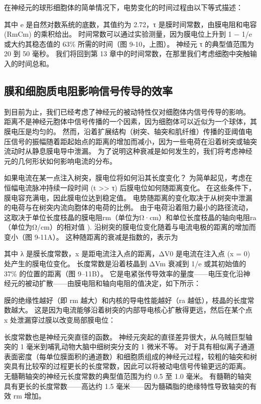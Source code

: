 在神经元的球形细胞体的简单情况下，电势变化的时间过程由以下等式描述：

其中 e 是自然对数系统的底数，其值约为 2.72，τ 是膜时间常数，由膜电阻和电容 (RmCm) 的乘积给出。 时间常数可以通过实验测量，因为膜电位上升到 1 − 1/e 或大约其稳态值的 63\% 所需的时间（图 9-10，上图）。 神经元 τ 的典型值范围为 20 到 50 毫秒。 我们将回到第 13 章中的时间常数，在那里我们考虑细胞中突触输入的时间总和。

\subsection{膜和细胞质电阻影响信号传导的效率}
到目前为止，我们已经考虑了神经元的被动特性仅对细胞体内信号传导的影响。 距离不是神经元胞体中信号传播的一个因素，因为细胞体可以近似为一个球体，其膜电压是均匀的。 然而，沿着扩展结构（树突、轴突和肌纤维）传播的亚阈值电压信号的振幅随着距起始点的距离的增加而减小，因为一些电荷在沿着树突或轴突流动时从静息膜电导中泄漏。 为了说明这种衰减是如何发生的，我们将考虑神经元的几何形状如何影响电流的分布。

如果电流在某一点注入树突，膜电位将如何沿其长度变化？ 为简单起见，考虑在恒幅电流脉冲持续一段时间 (t >> τ) 后膜电位如何随距离变化。 在这些条件下，膜电容充满电，因此膜电位达到稳定值。 电势随距离的变化取决于从树突中泄漏的电荷与在树突内流向胞体的电荷的比例。 由于电荷沿着阻力最小的路径流动，这取决于单位长度枝晶的膜电阻rm（单位为Ω·cm）和单位长度枝晶的轴向电阻ra（单位为Ω/cm）的相对值 ). 沿树突的膜电位变化随着与电流电极的距离的增加而变小（图 9-11A）。 这种随距离的衰减是指数的，表示为

其中 λ 是膜长度常数，x 是距电流注入点的距离，ΔV0 是电流在注入点 (x = 0) 处产生的膜电位变化。 长度常数是沿着枝晶到 ΔVm 衰减到 1/e 或其初始值的 37\% 的位置的距离（图 9–11B）。 它是电紧张传导效率的量度——电压变化沿神经元的被动扩散——由膜电阻和轴向电阻的值决定，如下所示：

膜的绝缘性越好（即 rm 越大）和内核的导电性能越好（ra 越低），枝晶的长度常数越大。 这是因为电流能够沿着树突的内部导电核心扩散得更远，然后在某个点 x 处泄漏穿过膜以改变局部膜电位：

长度常数也是神经元突直径的函数。 神经元突起的直径差异很大，从乌贼巨型轴突的 1 毫米到哺乳动物大脑中细树突分支的 1 微米不等。 对于具有相似离子通道表面密度（每单位膜面积的通道数）和细胞质组成的神经元过程，较粗的轴突和树突具有比较窄的过程更长的长度常数，因此可以将被动电信号传输更远的距离。 无髓鞘轴突的神经元长度常数的典型值范围为约 0.5 至 1.0 毫米。 有髓鞘的轴突具有更长的长度常数——高达约 1.5 毫米——因为髓磷脂的绝缘特性导致轴突的有效 rm 增加。

